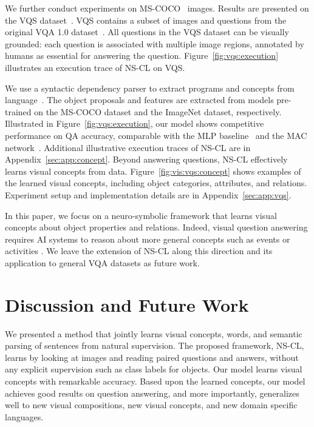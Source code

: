 \documentclass{article} %
\newcommand{\fig}[1]{Figure~\ref{#1}}
\newcommand{\model}{NS-CL\xspace}
\newcommand{\revisioncolor}{}
\begin{document}
{\revisioncolor

We further conduct experiments on MS-COCO~\citep{lin2014microsoft} images. Results are presented on the VQS dataset~\citep{Gan2017Vqs}. VQS contains a subset of images and questions from the original VQA 1.0 dataset~\citep{Antol2015Vqa}. All questions in the VQS dataset can be visually grounded: each question is associated with multiple image regions, annotated by humans as essential for answering the question. \fig{fig:vqs:execution} illustrates an execution trace of \model on VQS.

We use a syntactic dependency parser to extract programs and concepts from language~\citep{Andreas2016Learning,Schuster2015Generating}. The object proposals and features are extracted from models pre-trained on the MS-COCO dataset and the ImageNet dataset, respectively. Illustrated in \fig{fig:vqs:execution}, our model shows competitive performance on QA accuracy, comparable with the MLP baseline~\citep{Jabri2016Revisiting} and the MAC network~\citep{Hudson2018Compositional}. Additional illustrative execution traces of \model are in Appendix~\ref{sec:app:concept}. Beyond answering questions, \model effectively learns visual concepts from data. \fig{fig:vis:vqs:concept} shows examples of the learned visual concepts, including object categories, attributes, and relations. Experiment setup and implementation details are in Appendix~\ref{sec:app:vqs}. 

In this paper, we focus on a neuro-symbolic framework that learns visual concepts about object properties and relations. Indeed, visual question answering requires AI systems to reason about more general concepts such as events or activities \citep{Levin1993English}. We leave the extension of \model along this direction and its application to general VQA datasets \citep{Antol2015Vqa} as future work.
}
%
%
\section{Discussion and Future Work}
We presented a method that jointly learns visual concepts, words, and semantic parsing of sentences from natural supervision. The proposed framework, \model, learns by looking at images and reading paired questions and answers, without any explicit supervision such as class labels for objects. Our model learns visual concepts with remarkable accuracy. Based upon the learned concepts, our model achieves good results on question answering, and more importantly, generalizes well to new visual compositions, new visual concepts, and new domain specific languages.
\end{document}

